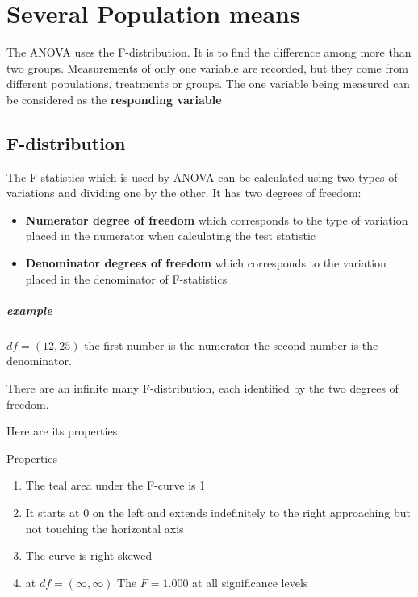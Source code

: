 \documentclass[../STAT-252-Notes.tex]{subfiles}
\begin{document}
\chapter{Several Population means}
The ANOVA uses the F-distribution. It is to find the difference among more than two groups.
Measurements of only one variable are recorded, but they come from different populations, treatments or groups.
The one variable being measured can be considered as the \textbf{responding variable}

\section{F-distribution}
The F-statistics which is used by ANOVA can be calculated using two types of variations and dividing one by the other. It has two degrees of freedom:
\begin{itemize}
  \item \textbf{Numerator degree of freedom} which corresponds to the type of variation placed in the numerator when calculating the test statistic 
    \item \textbf{Denominator degrees of freedom} which corresponds to the variation placed in the denominator of F-statistics
\end{itemize}
\paragraph{example}
$df = (12,25)$ the first number is the numerator the second number is the denominator.


There are an infinite many F-distribution, each identified by the two degrees of freedom.

Here are its properties:
\begin{DndSidebar}[color=PhbLightGreen]{Properties}
  \begin{enumerate}
    \item The teal area under the F-curve is 1 
    \item It starts at 0 on the left and extends indefinitely to the right approaching but not touching the horizontal axis
    \item The curve is right skewed
    \item at $df = (\infty,\infty)$ The $F = 1.000$ at all significance levels
  \end{enumerate}
\end{DndSidebar}
\end{document}

